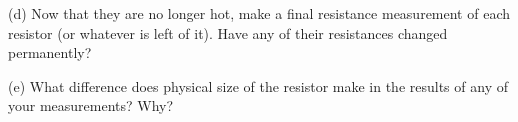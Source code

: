 (d) Now that they are no longer hot, make a final resistance measurement of each resistor (or whatever is left of it).  Have any of their resistances changed permanently?
\vspace{1.5in}

(e) What difference does physical size of the resistor make in the results of any of your measurements?  Why?
\vspace{1.5in}






